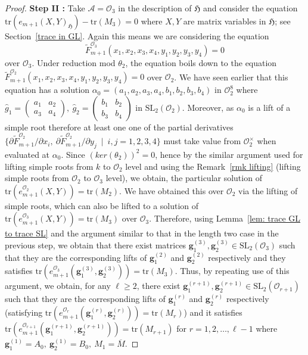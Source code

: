 \documentclass[10pt,twoside]{amsart}
\newcommand{\SL}{\mathrm{SL}}
\newcommand{\tr}{\mathrm{tr}}
\newcommand{\R}{\mathcal{O}_2}
\theoremstyle{definition}
\theoremstyle{definition}
\begin{document}
\begin{proof}
\textbf{Step II :} Take $\mathcal{A} = \mathcal{O}_3$ in the description of $\mathfrak{H}$ and consider the equation $\tr(e_{m+1}(X, Y)_{\mathfrak{H}}) - \tr(M_3) = 0$ where $X,Y$ are matrix variables in $\mathfrak{H}$; see Section~\ref{trace in GL}. Again this means we are considering the equation $$\widetilde F_{m+1}^{\mathcal{O}_3}(x_1, x_2, x_3, x_4, y_1, y_2, y_3, y_4) = 0$$ 
over $\mathcal{O}_3$. Under reduction mod $\theta_2$, the equation boils down to the equation $\widetilde F_{m+1}^{\R}(x_1, x_2, x_3, x_4, y_1, y_2, y_3, y_4) = 0$ over $\mathcal{O}_2$. We have seen earlier that this equation has a solution $\alpha_0=(a_1, a_2, a_3, a_4, b_1, b_2, b_3, b_4)$ in $\mathcal{O}^8_2$ where $\widehat{g}_1=\left(\begin{array}{cc} a_1 & a_2 \\  a_3 & a_4 \end{array}\right),\ \widehat{g}_2=\left(\begin{array}{cc} b_1 & b_2 \\ b_3 & b_4
\end{array}\right)$ in $\SL_2(\R)$. Moreover, as $\alpha_0$ is a lift of a simple root therefore at least one one of the partial derivatives $\{\partial \widetilde F_{m+1}^{\R}/\partial x_{i},\ \partial \widetilde F_{m+1}^{\R}/\partial y_{j}\ \mid \ i,j=1,2,3,4\}$ must take value from $\R^{\times}$ when evaluated at $\alpha_0$. Since $(ker(\theta_2))^2=0$, hence by the similar argument used for lifting simple roots from $k$ to $\mathcal{O}_2$ level and using the Remark~\ref{rmk lifting} (lifting simple roots from $\mathcal{O}_2$ to $\mathcal{O}_3$ level), we obtain, the particular solution of  $\tr(e_{m+1}^{\R}(X, Y)) = \tr(M_2)$. We have obtained this over $\mathcal{O}_2$ via the lifting of simple roots, which can also be lifted to a solution of  $\tr(e_{m+1}^{\mathcal{O}_3}(X, Y))=\tr(M_3)$ over $\mathcal{O}_3$. Therefore, using Lemma~\ref{lem: trace GL to trace SL} and the argument similar to that in the length two case in the previous step, we obtain that there exist matrices $\mathbf{g}_1^{(3)}, \mathbf{g}_2^{(3)}\in \SL_2(\mathcal{O}_3)$ such that they are the corresponding lifts of $\mathbf{g}_1^{(2)}$ and $\mathbf{g}_2^{(2)}$ respectively and they satisfies $\tr(e_{m+1}^{\mathcal{O}_3}(\mathbf{g}_1^{(3)}, \mathbf{g}_2^{(3)})) = \tr(M_3)$. Thus, by repeating use of this argument, we obtain, for any $\ell\geq 2$, there exist $\mathbf{g}_1^{(r+1)}, \mathbf{g}_2^{(r+1)}\in \SL_2(\mathcal{O}_{r+1})$ such that they are the corresponding lifts of $\mathbf{g}_1^{(r)}$ and $\mathbf{g}_2^{(r)}$ respectively (satisfying $\tr(e_{m+1}^{\mathcal{O}_r}(\mathbf{g}_1^{(r)}, \mathbf{g}_2^{(r)}))=\tr(M_{r})$) and it satisfies $\tr(e_{m+1}^{\mathcal{O}_{r+1}}(\mathbf{g}_1^{(r+1)}, \mathbf{g}_2^{(r+1)}))=\tr(M_{r+1})$ for $r=1,2,\ldots,\ell-1$ where $\mathbf{g}_1^{(1)}=A_0,\ \mathbf{g}_2^{(1)}=B_0,\  M_1=\overline{M}$. 


\end{proof}
\end{document}
